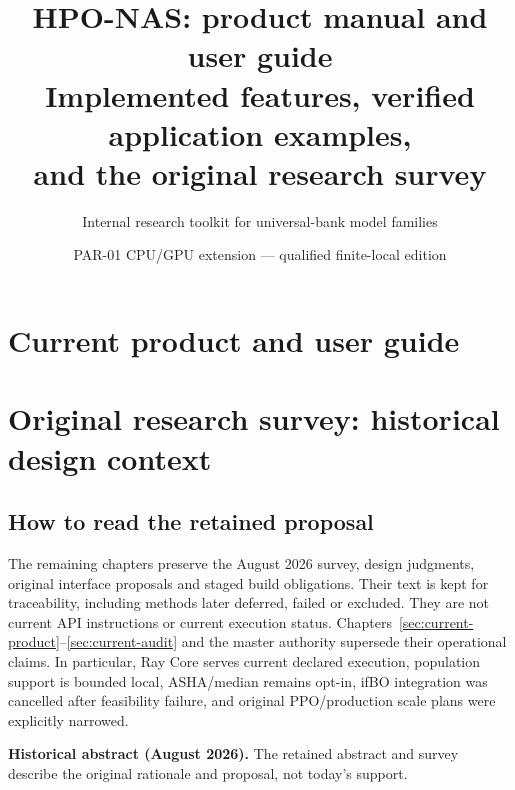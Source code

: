 \documentclass[11pt]{report}
\title{HPO-NAS: product manual and user guide\\
Implemented features, verified application examples,\\
and the original research survey}
\author{Internal research toolkit for universal-bank model families}
\date{PAR-01 CPU/GPU extension --- qualified finite-local edition}
\newenvironment{decisions}{%
  \def\FrameCommand{{\color{blue!50!black}\vrule width 2.5pt}\hspace{8pt}}%
  \MakeFramed{\advance\hsize-\width\FrameRestore}\small}%
{\endMakeFramed}
\begin{document}
\maketitle

\begin{abstract}

\end{abstract}

\setcounter{tocdepth}{1}
\tableofcontents
\clearpage

\part{Current product and user guide}









\clearpage
\sloppy
\addtolength{\textheight}{5pt}
\part{Original research survey: historical design context}
\chapter*{How to read the retained proposal}
The remaining chapters preserve the August 2026 survey, design judgments,
original interface proposals and staged build obligations. Their text is kept
for traceability, including methods later deferred, failed or excluded.
They are not current API instructions or current execution status.
Chapters~\ref{sec:current-product}--\ref{sec:current-audit} and the master
authority supersede their operational claims. In particular, Ray Core serves
current declared execution, population support is bounded local, ASHA/median
remains opt-in, ifBO integration was cancelled after feasibility failure, and
original PPO/production scale plans were explicitly narrowed.

\begin{decisions}
\textbf{Historical abstract (August 2026).} The retained abstract and survey
describe the original rationale and proposal, not today's support.
\end{decisions}

\clearpage


\end{document}
